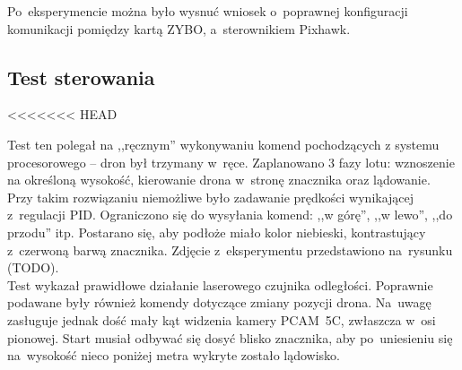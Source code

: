Po~eksperymencie można było wysnuć wniosek o~poprawnej konfiguracji komunikacji pomiędzy kartą ZYBO, a~sterownikiem Pixhawk.

\subsection{Test sterowania}
\label{sec:test_sterowania}
<<<<<<< HEAD

Test ten polegał na ,,ręcznym'' wykonywaniu komend pochodzących z systemu procesorowego -- dron był trzymany w~ręce. 
Zaplanowano 3 fazy lotu: wznoszenie na określoną wysokość, kierowanie drona w~stronę znacznika oraz lądowanie.
Przy takim rozwiązaniu niemożliwe było zadawanie prędkości wynikającej z~regulacji PID. 
Ograniczono się do wysyłania komend: ,,w górę'', ,,w lewo'', ,,do przodu'' itp. 
Postarano się, aby podłoże miało kolor niebieski, kontrastujący z~czerwoną barwą znacznika. 
Zdjęcie z~eksperymentu przedstawiono na~rysunku (TODO).\\

Test wykazał prawidłowe działanie laserowego czujnika odległości. 
Poprawnie podawane były również komendy dotyczące zmiany pozycji drona. 
Na~uwagę zasługuje jednak dość mały kąt widzenia kamery PCAM~5C, zwłaszcza w~osi pionowej. 
Start musiał odbywać się dosyć blisko znacznika, aby po~uniesieniu się na~wysokość nieco poniżej metra wykryte zostało lądowisko.

